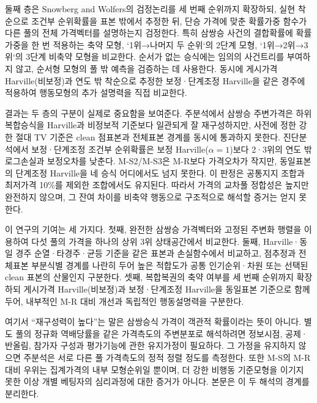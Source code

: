 둘째 층은 Snowberg and Wolfers의 검정논리를 세 번째 순위까지 확장하되,
실현 착순으로 조건부 순위확률을 표본 밖에서 추정한 뒤, 단승 가격에 맞춘
확률가중 함수가 다른 풀의 전체 가격벡터를 설명하는지 검정한다.
특히 삼쌍승 사건의 결합확률에 확률가중을 한 번 적용하는 축약 모형,
`1위→나머지 두 순위`의 2단계 모형, `1위→2위→3위`의 3단계 비축약 모형을
비교한다. 순서가 없는 승식에는 임의의 사건트리를 부여하지 않고, 순서형 모형의
풀 밖 예측을 검증하는 데 사용한다. 동시에 게시가격 Harville(비보정)과 연도 밖
착순으로 추정한 보정·단계조정 Harville을 같은 경주에 적용하여 행동모형의 추가 설명력을
직접 비교한다.

결과는 두 층의 구분이 실제로 중요함을 보여준다. 주분석에서 삼쌍승 주변가격은
하위 복합승식을 Harville과 비정보적 기준보다 일관되게 잘 재구성하지만,
사전에 정한 강한 절대 TV 기준은 clean 점표본과 전체표본 경계를 동시에
통과하지 못한다. 진단분석에서 보정·단계조정 조건부 순위확률은 보정 Harville($\alpha=1$)보다
2·3위의 연도 밖 로그손실과 보정오차를 낮춘다. M-S2/M-S3은 M-R보다
가격오차가 작지만, 동일표본의 단계조정 Harville을 네 승식 어디에서도 넘지
못한다. 이 판정은 공통지지 조합과 최저가격 10\%를 제외한 조합에서도 유지된다.
따라서 가격의 교차풀 정합성은 높지만 완전하지 않으며, 그 잔여 차이를 비축약
행동으로 구조적으로 해석할 증거는 얻지 못한다.

이 연구의 기여는 세 가지다. 첫째, 완전한 삼쌍승 가격벡터와 고정된 주변화
행렬을 이용하여 다섯 풀의 가격을 하나의 상위 3위 상태공간에서 비교한다.
둘째, Harville·동일 경주 순열·타경주·균등 기준을 같은 표본과 손실함수에서
비교하고, 점추정과 전체표본 부분식별 경계를 나란히 두어 높은 적합도가 공통
인기순위·차원 또는 선택된 clean 표본의 산물인지 구분한다. 셋째,
복합복권의 축약 여부를 세 번째 순위까지 확장하되 게시가격 Harville(비보정)과
보정·단계조정 Harville을
동일표본 기준으로 함께 두어, 내부적인 M-R 대비 개선과 독립적인 행동설명력을
구분한다.

여기서 ``재구성력이 높다''는 말은 삼쌍승식 가격이 객관적 확률이라는 뜻이
아니다. 별도 풀의 정규화 역배당률을 같은 가격측도의 주변분포로 해석하려면
정보시점, 공제·반올림, 참가자 구성과 평가기능에 관한 유지가정이 필요하다.
그 가정을 유지하지 않으면 주분석은 서로 다른 풀 가격측도의 정적 정렬 정도를
측정한다. 또한 M-S의 M-R 대비 우위는 집계가격의 내부 모형순위일 뿐이며,
더 강한 비행동 기준모형을 이기지 못한 이상 개별 베팅자의 심리과정에 대한
증거가 아니다. 본문은 이 두 해석의 경계를 분리한다.
